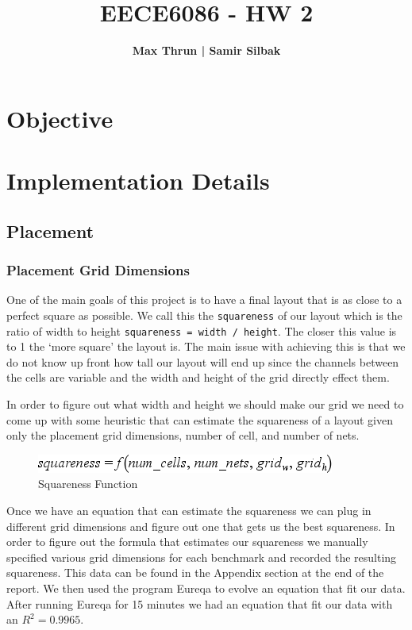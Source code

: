 \documentclass[10pt]{article}
\title{
    \vspace{2in}
    \textmd{\textbf{EECE6086 - HW 2}}\\
    \vspace{4in}
}
\author{\textbf{Max Thrun | Samir Silbak}}
\begin{document}
\maketitle
\newpage
\section{Objective}

\section{Implementation Details}

\subsection{Placement}

    \subsubsection{Placement Grid Dimensions}

        One of the main goals of this project is to have a final layout that is
        as close to a perfect square as possible. We call this the
        \texttt{squareness} of our layout which is the ratio of width to height
        \texttt{squareness = width / height}.  The closer this value is to 1
        the `more square' the layout is.  The main issue with achieving this is
        that we do not know up front how tall our layout will end up since the
        channels between the cells are variable and the width and height of the grid
        directly effect them.

        In order to figure out what width and height we should make our grid we need
        to come up with some heuristic that can estimate the squareness of a layout
        given only the placement grid dimensions, number of cell, and number of nets.

        \begin{figure}[H]
            \centering
            \includegraphics{./square_f.png}
            \caption{Squareness Function}
        \end{figure}

        Once we have an equation that can estimate the squareness we can plug
        in different grid dimensions and figure out one that gets us the best
        squareness. In order to figure out the formula that estimates our
        squareness we manually specified various grid dimensions for each
        benchmark and recorded the resulting squareness. This data can be found
        in the Appendix section at the end of the report. We then used the
        program Eureqa to evolve an equation that fit our data. After running
        Eureqa for 15 minutes we had an equation that fit our data with an $
        R^{2} =  0.9965 $.
\end{document}
